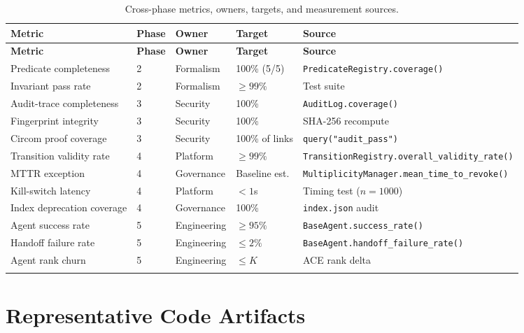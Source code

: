 \documentclass[12pt,letterpaper]{article}
\theoremstyle{definition}
\theoremstyle{remark}
\begin{document}
\begin{longtable}{@{}lllll@{}}
\toprule
\textbf{Metric} & \textbf{Phase} & \textbf{Owner} & \textbf{Target} & \textbf{Source} \\
\midrule
\endfirsthead
\toprule
\textbf{Metric} & \textbf{Phase} & \textbf{Owner} & \textbf{Target} & \textbf{Source} \\
\midrule
\endhead
Predicate completeness        & 2 & Formalism  & 100\% (5/5)       & \texttt{PredicateRegistry.coverage()} \\
Invariant pass rate           & 2 & Formalism  & \(\geq 99\%\)     & Test suite \\
Audit-trace completeness      & 3 & Security   & 100\%             & \texttt{AuditLog.coverage()} \\
Fingerprint integrity         & 3 & Security   & 100\%             & SHA-256 recompute \\
Circom proof coverage         & 3 & Security   & 100\% of links    & \texttt{query("audit\_pass")} \\
Transition validity rate      & 4 & Platform   & \(\geq 99\%\)     & \texttt{TransitionRegistry.overall\_validity\_rate()} \\
MTTR exception                & 4 & Governance & Baseline est.     & \texttt{MultiplicityManager.mean\_time\_to\_revoke()} \\
Kill-switch latency           & 4 & Platform   & \(< 1\)s          & Timing test (\(n=1000\)) \\
Index deprecation coverage    & 4 & Governance & 100\%             & \texttt{index.json} audit \\
Agent success rate            & 5 & Engineering& \(\geq 95\%\)     & \texttt{BaseAgent.success\_rate()} \\
Handoff failure rate          & 5 & Engineering& \(\leq 2\%\)      & \texttt{BaseAgent.handoff\_failure\_rate()} \\
Agent rank churn              & 5 & Engineering& \(\leq K\)        & ACE rank delta \\
\bottomrule
\caption{Cross-phase metrics, owners, targets, and measurement sources.}
\end{longtable}

\newpage

\section{Representative Code Artifacts}
\end{document}
